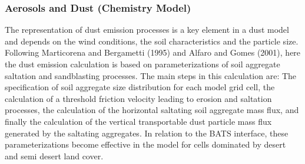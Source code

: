 \subsubsection{Aerosols and Dust (Chemistry Model)} 
The representation of dust emission processes is a key element in a dust model and depends on the wind conditions, the soil characteristics and the particle size. Following Marticorena and Bergametti (1995) and Alfaro and Gomes (2001), here the dust emission calculation is based on parameterizations of soil aggregate saltation and sandblasting processes. The main steps in this calculation are: The specification of soil aggregate size distribution for each model grid cell, the calculation of a threshold friction velocity leading to erosion and saltation processes, the calculation of the horizontal saltating soil aggregate mass flux, and finally the calculation of the vertical transportable dust particle mass flux generated by the saltating aggregates. In relation to the BATS interface, these parameterizations become effective in the model for cells dominated by desert and semi desert land cover. 
